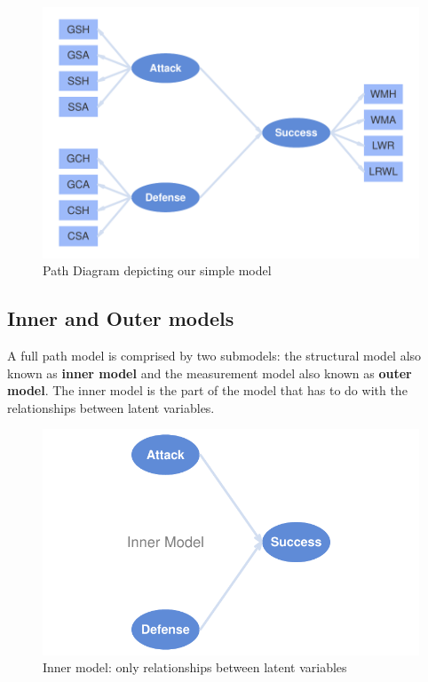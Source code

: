 \documentclass[12pt]{book}\usepackage{graphicx, color}
\newenvironment{knitrout}{}{} %
\begin{document}
\begin{knitrout}
\color{fgcolor}\begin{figure}[h]


{\centering \includegraphics[width=.9\linewidth,height=.5\linewidth]{figure/spainfoot_model_diagram} 

}

\caption[Path Diagram depicting our simple model]{Path Diagram depicting our simple model\label{fig:spainfoot_model_diagram}}
\end{figure}


\end{knitrout}





\subsection{Inner and Outer models}
A full path model is comprised by two submodels: the structural model also known as \textbf{inner model} and the measurement model also known as \textbf{outer model}. The inner model is the part of the model that has to do with the relationships between latent variables. 
\begin{knitrout}
\color{fgcolor}\begin{figure}[h]


{\centering \includegraphics[width=.75\linewidth,height=.3\linewidth]{figure/spainfoot_inner_model_diag} 

}

\caption[Inner model]{Inner model: only relationships between latent variables\label{fig:spainfoot_inner_model_diag}}
\end{figure}


\end{knitrout}
\end{document}
